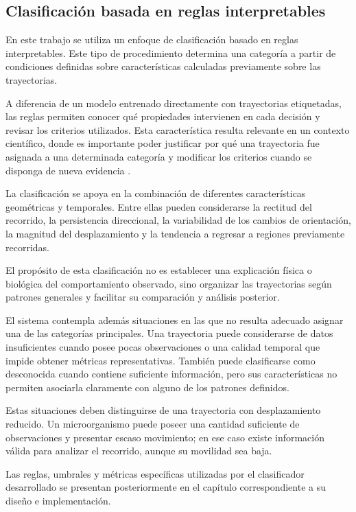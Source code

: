\subsection{Clasificación basada en reglas interpretables}

En este trabajo se utiliza un enfoque de clasificación basado en reglas interpretables. Este tipo de procedimiento determina una categoría a partir de condiciones definidas sobre características calculadas previamente sobre las trayectorias.

A diferencia de un modelo entrenado directamente con trayectorias etiquetadas, las reglas permiten conocer qué propiedades intervienen en cada decisión y revisar los criterios utilizados. Esta característica resulta relevante en un contexto científico, donde es importante poder justificar por qué una trayectoria fue asignada a una determinada categoría y modificar los criterios cuando se disponga de nueva evidencia \cite{rudin2019}.

La clasificación se apoya en la combinación de diferentes características geométricas y temporales. Entre ellas pueden considerarse la rectitud del recorrido, la persistencia direccional, la variabilidad de los cambios de orientación, la magnitud del desplazamiento y la tendencia a regresar a regiones previamente recorridas.

El propósito de esta clasificación no es establecer una explicación física o biológica del comportamiento observado, sino organizar las trayectorias según patrones generales y facilitar su comparación y análisis posterior.

El sistema contempla además situaciones en las que no resulta adecuado asignar una de las categorías principales. Una trayectoria puede considerarse de datos insuficientes cuando posee pocas observaciones o una calidad temporal que impide obtener métricas representativas. También puede clasificarse como desconocida cuando contiene suficiente información, pero sus características no permiten asociarla claramente con alguno de los patrones definidos.

Estas situaciones deben distinguirse de una trayectoria con desplazamiento reducido. Un microorganismo puede poseer una cantidad suficiente de observaciones y presentar escaso movimiento; en ese caso existe información válida para analizar el recorrido, aunque su movilidad sea baja.

Las reglas, umbrales y métricas específicas utilizadas por el clasificador desarrollado se presentan posteriormente en el capítulo correspondiente a su diseño e implementación.


